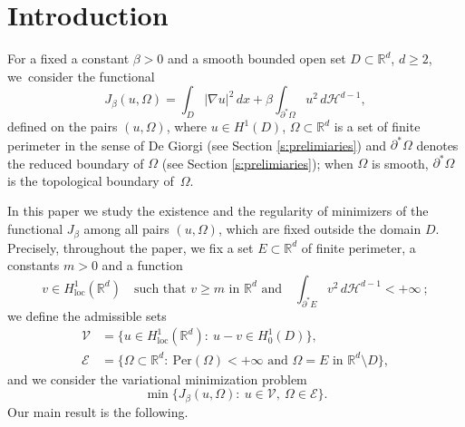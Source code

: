\documentclass[11pt]{article}
\numberwithin{equation}{section}
\newcommand{\loc}{\mathrm{loc}}
\newcommand{\Per}{\mathrm{Per}}
\theoremstyle{plain}
\theoremstyle{definition}
\def\R{\mathbb{R}}
\def\HH{\mathcal{H}}
\begin{document}
\section{Introduction}\label{s:intro}
For a fixed a constant $\beta>0$ and a smooth bounded open set $D\subset \R^d$, $d\ge 2$, we~consider the functional
\[J_\beta(u,\Omega)=\int_D|\nabla u|^2\,dx+\beta\int_{\partial^\ast \Omega}u^2\,d\HH^{d-1},\]
defined on the pairs $(u,\Omega)$, where $u\in H^1(D)$, $\Omega\subset\R^d$ is a set of finite perimeter in the sense of De Giorgi (see Section \ref{s:prelimiaries})
and $\partial^\ast\Omega$ denotes the reduced boundary of $\Omega$ (see Section \ref{s:prelimiaries}); when $\Omega$ is smooth, $\partial^\ast\Omega$ is the topological boundary of~$\Omega$.

In this paper we study the existence and the regularity of minimizers of the functional $J_\beta$
among all pairs $(u,\Omega)$, which are fixed outside the domain $D$. Precisely, throughout the paper, we fix a set $E\subset\R^d$ of finite perimeter, a constants $m>0$ and a function
\[v\in H^1_{\loc}(\R^d)\quad\text{such that $v\ge m$ in $\R^d$ and}\quad\int_{\partial^\ast E}v^2\,d\HH^{d-1}<+\infty\ ;\]
we define the admissible sets
\begin{align*}
\mathcal V&=\big\{u\in H^1_{\loc}(\R^d):\ u-v\in H^1_0(D)\big\},\\
\mathcal E&=\big\{\Omega\subset\R^d:\ \Per(\Omega)<+\infty\text{ and } \Omega=E \text{ in } \R^d\setminus D\big\},
\end{align*}
and we consider the variational minimization problem
\begin{equation}\label{e:pb}
\min\big\{J_\beta(u,\Omega):\ u\in\mathcal V,\ \Omega\in\mathcal E\big\}.
\end{equation}
Our main result is the following.
\end{document}
